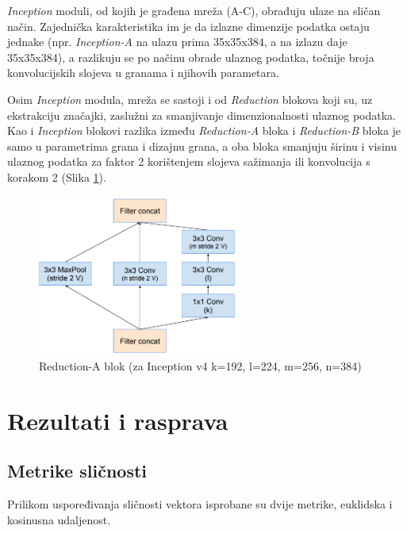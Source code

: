 \documentclass[times, utf8, proizvoljni, numeric]{fer}
\begin{document}
\textit{Inception} moduli, od kojih je građena mreža (A-C), obrađuju ulaze na sličan način. Zajednička karakteristika im je da izlazne dimenzije podatka ostaju jednake (npr. \textit{Inception-A} na ulazu prima 35x35x384, a na izlazu daje 35x35x384), a razlikuju se po načinu obrade ulaznog podatka, točnije broja konvolucijskih slojeva u granama i njihovih parametara.

Osim \textit{Inception} modula, mreža se sastoji i od \textit{Reduction} blokova koji su, uz ekstrakciju značajki, zaslužni za smanjivanje dimenzionalnosti ulaznog podatka. Kao i \textit{Inception} blokovi razlika između \textit{Reduction-A} bloka i \textit{Reduction-B} bloka je samo u parametrima grana i dizajnu grana, a oba bloka smanjuju širinu i visinu ulaznog podatka za faktor 2 korištenjem slojeva sažimanja ili konvolucija s korakom 2 (Slika \ref{fg:inception_reduction_a}).

\begin{figure}[!ht]
	\begin{center}
		\captionsetup{justification=centering}
		\includegraphics[width=0.6\textwidth]{./imgs/inception_reduction_a.png}
		\caption{Reduction-A blok (za Inception v4 k=192, l=224, m=256, n=384) \cite{Inceptionv4}}
		\label{fg:inception_reduction_a}
	\end{center}
\end{figure}
\chapter{Rezultati i rasprava}

\section{Metrike sličnosti}

Prilikom uspoređivanja sličnosti vektora isprobane su dvije metrike, euklidska i kosinusna udaljenost. 
\end{document}
